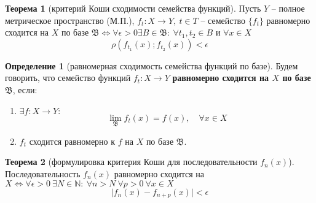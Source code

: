 \documentclass{report}
\theoremstyle{definition}
\newtheorem{definition}{Определение}[section]
\newtheorem{theorem}{Теорема}[section]
\begin{document}
\begin{theorem}[критерий Коши сходимости семейства функций]
  Пусть $Y$ -- полное метрическое пространство (М.П.), $f_t:X \rightarrow Y, \ t \in T$ -- семейство $\{f_t\}$ равномерно сходится на $X$ по базе $\mathfrak{B} \iff \forall \epsilon > 0 \exists B \in \mathfrak{B}: \ \forall t_1,t_2 \in B$ и $\forall x \in X$
  \begin{equation*}
    \rho(f_{t_1}(x);f_{t_2}(x)) < \epsilon
  \end{equation*}
\end{theorem}

\begin{definition}[равномерная сходимость семейства функций по базе]
  Будем говорить, что семейство функций $f_t: X \rightarrow Y$ \textbf{равномерно сходится на $X$ по базе} $\mathfrak{B}$, если:
  \begin{enumerate}
    \item $\exists f: X \rightarrow Y:$
          \begin{equation*}
            \underset{\mathfrak{B}}{\lim}f_t(x) = f(x), \quad \forall x \in X
          \end{equation*}
    \item $f_t$ сходится равномерно к $f$ на $X$ по базе $\mathfrak{B}$.
  \end{enumerate}
\end{definition}

\begin{theorem}[формулировка критерия Коши для последовательности $f_n(x)$]
  Последовательность $f_n(x)$ равномерно сходится на $X \iff \forall \epsilon > 0 \ \exists N \in \mathbb{N}: \ \forall n > N \ \forall p > 0 \ \forall x \in X$
  \begin{equation*}
    \big|f_n(x) - f_{n+p}(x)\big| < \epsilon
  \end{equation*}
\end{theorem}
\end{document}

